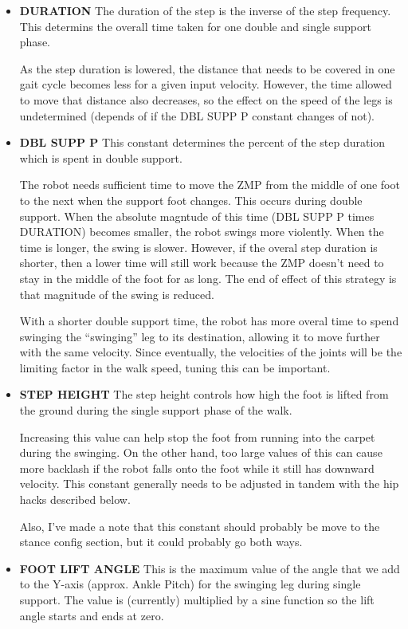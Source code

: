 \documentclass[11pt]{article}
\begin{document}
\begin{itemize}
\item {\bf DURATION}  The duration of the step is the inverse of the step
frequency. This determins the overall time taken for one double and single
support phase.

As the step duration is lowered, the distance that needs to be covered
in one gait cycle becomes less for a given input velocity. However, the
time allowed to move that distance also decreases, so the effect on the
speed of the legs is undetermined (depends of if the DBL SUPP P constant
changes of not).
\item {\bf DBL SUPP P} This constant determines the percent of the step
duration which is spent in double support.

The robot needs sufficient time to move the ZMP from the middle of one foot
to the next when the support foot changes. This occurs during double support.
When the absolute magntude of this time (DBL SUPP P times DURATION) becomes
smaller, the robot swings more violently. When the time is longer, the swing
is slower.  However, if the overal step duration is shorter, then a lower
time will still work because the ZMP doesn't need to stay in the middle of the
foot for as long. The end of effect of this strategy is that magnitude of
the swing is reduced.

With a shorter double support time, the robot has more overal time to spend
swinging the ``swinging'' leg to its destination, allowing it to move further
with the same velocity.  Since eventually, the velocities of the joints will
be the limiting factor in the walk speed, tuning this can be important.

\item {\bf STEP HEIGHT}  The step height controls how high the foot is lifted
from the ground during the single support phase of the walk.

Increasing this value can help stop the foot from running into the carpet
during the swinging. On the other hand, too large values of this can cause
more backlash if the robot falls onto the foot while it still has downward
velocity. This constant generally needs to be adjusted in tandem with the
hip hacks described below.

Also, I've made a note that this constant should probably be move to the
stance config section, but it could probably go both ways.

\item {\bf FOOT LIFT ANGLE} This is the maximum value of the angle that
we add to the Y-axis (approx. Ankle Pitch) for the swinging leg during
single support. The value is (currently) multiplied by a sine function
so the lift angle starts and ends at zero.


\end{itemize}
\end{document}
